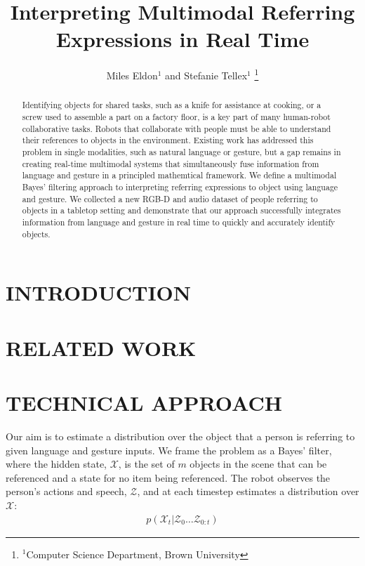\documentclass[letterpaper, 10 pt, conference]{ieeeconf}
\title{\LARGE \bf
Interpreting Multimodal Referring Expressions in Real Time}
\author{Miles Eldon$^{1}$ and Stefanie Tellex$^{1}$
\thanks{$^{1}$Computer Science Department, Brown University}
}
\begin{document}
\maketitle
\thispagestyle{empty}
\pagestyle{empty}

\begin{abstract}
Identifying objects for shared tasks, such as a knife for assistance
at cooking, or a screw used to assemble a part on a factory floor, is
a key part of many human-robot collaborative tasks.  Robots that
collaborate with people must be able to understand their references to
objects in the environment.  Existing work has addressed this problem
in single modalities, such as natural language or gesture, but a gap
remains in creating real-time multimodal systems that simultaneously
fuse information from language and gesture in a principled mathemtical
framework.  We define a multimodal Bayes' filtering approach to
interpreting referring expressions to object using language and
gesture.  We collected a new RGB-D and audio dataset of people
referring to objects in a tabletop setting and demonstrate that our
approach successfully integrates information from language and gesture
in real time to quickly and accurately identify objects.
\end{abstract}

\section{INTRODUCTION}

\section{RELATED WORK}


\citep{matuszek12}

\section{TECHNICAL APPROACH}

Our aim is to estimate a distribution over the object that a person is
referring to given language and gesture inputs.  We frame the problem
as a Bayes' filter, where the hidden state, $\mathcal{X}$, is the set
of $m$ objects in the scene that can be referenced and a state for no
item being referenced.  The robot observes the person's actions and
speech, $\mathcal{Z}$, and at each timestep estimates a distribution
over $\mathcal{X}$:
\begin{align}
  p(\mathcal{X}_t | \mathcal{Z}_0 \dots \mathcal{Z}_{0:t})
\end{align}
\end{document}
